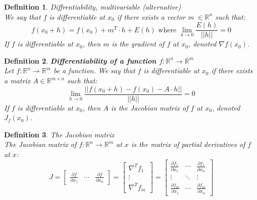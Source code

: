 \documentclass[11pt]{book} %
\newtheorem{definition}{Definition}[section]
\begin{document}
\bigbreak

\begin{definition}{Diffrentiability, multivariable (alternative)} \\
We say that $f$ is differentiable at $x_0$ if there exists a vector m $\in \mathbb{R}^n$ such that:
\begin{equation}
    f(x_0 + h) = f(x_0) + m^T \cdot h + E(h) \text{ where } \lim_{h \rightarrow 0} \frac{E(h)}{||h||} = 0
\end{equation}
If $f$ is differentiable at $x_0$, then $m$ is the gradient of $f$ at $x_0$, denoted $\nabla f(x_0)$.
\end{definition}

\bigbreak

\begin{definition}{\textbf{Differentiability of a function $f: \mathbb{R}^n \rightarrow \mathbb{R}^m$}} \\
    Let $f: \mathbb{R}^n \rightarrow \mathbb{R}^m$ be a function. We say that $f$ is differentiable at $x_0$ 
    if there exists a matrix $A \in \mathbb{R}^{m \times n}$ such that:
    \begin{equation}
        \lim_{h \rightarrow 0} \frac{||f(x_0 + h) - f(x_0) - A \cdot h||}{||h||} = 0
    \end{equation}
    If $f$ is differentiable at $x_0$, then $A$ is the Jacobian matrix of $f$ at $x_0$, denoted $J_f(x_0)$.
\end{definition}


\begin{definition}{The Jacobian matrix} \\
    The Jacobian matrix of $f: \mathbb{R}^n \rightarrow \mathbb{R}^m$ at $x$ is the matrix of partial derivatives of $f$ at $x$:
    \[
        J = \left[
        \begin{array}{ccc}
        \frac{\partial f}{\partial x_1} & \cdots & \frac{\partial f}{\partial x_n}
        \end{array}
        \right]
        = \left[
        \begin{array}{c}
        \nabla^T f_1 \\
        \vdots \\
        \nabla^T f_m
        \end{array}
        \right]
        = \left[
        \begin{array}{ccc}
        \frac{\partial f_1}{\partial x_1} & \cdots & \frac{\partial f_1}{\partial x_n} \\
        \vdots & \ddots & \vdots \\
        \frac{\partial f_m}{\partial x_1} & \cdots & \frac{\partial f_m}{\partial x_n}
        \end{array}
        \right]
    \]
    \end{definition}
    
\end{document}

